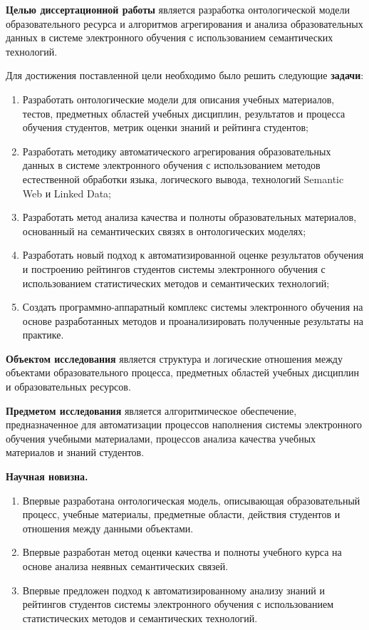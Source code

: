 \textbf{Целью диссертационной работы} является разработка онтологической модели образовательного ресурса и алгоритмов агрегирования и анализа образовательных данных в системе электронного обучения с использованием семантических технологий. 

Для достижения поставленной цели необходимо было решить следующие \textbf{задачи}:
\begin{enumerate}
 \item Разработать онтологические модели для описания учебных материалов, тестов, предметных областей учебных дисциплин, результатов и процесса обучения студентов, метрик оценки знаний и рейтинга студентов;
 \item Разработать методику автоматического агрегирования образовательных данных в системе электронного обучения с использованием методов естественной обработки языка, логического вывода, технологий Semantic Web и Linked Data;
 \item Разработать метод анализа качества и полноты образовательных материалов, основанный на семантических связях в онтологических моделях;
  \item Разработать новый подход к автоматизированной оценке результатов обучения и построению рейтингов студентов системы электронного обучения с использованием статистических методов и семантических технологий;
  \item Создать программно-аппаратный комплекс системы электронного обучения на основе разработанных методов и проанализировать полученные результаты на практике.  
 \end{enumerate}

\textbf{Объектом исследования} является структура и логические отношения между объектами образовательного процесса, предметных областей учебных дисциплин и образовательных ресурсов.  

\textbf{Предметом исследования} является алгоритмическое обеспечение, предназначенное для автоматизации процессов наполнения системы электронного обучения учебными материалами, процессов анализа качества учебных материалов и знаний студентов. 

\textbf{Научная новизна.}
\begin{enumerate}
 \item Впервые разработана онтологическая модель, описывающая образовательный процесс, учебные материалы, предметные области, действия студентов и отношения между данными объектами. 
 \item Впервые разработан метод оценки качества и полноты учебного курса на основе анализа неявных семантических связей.
 \item Впервые предложен подход к автоматизированному анализу знаний и рейтингов студентов системы электронного обучения с использованием статистических методов и семантических технологий.
\end{enumerate}

